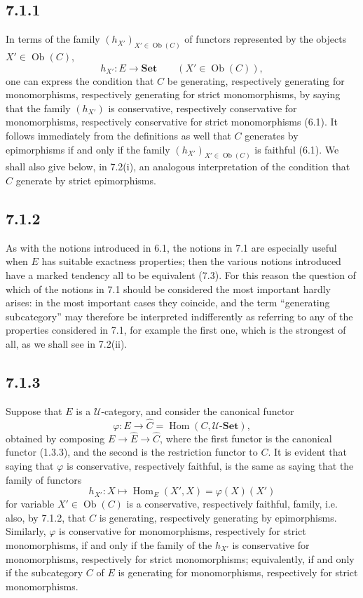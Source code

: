 \documentclass[11pt]{article}
\newcommand{\U}{\mathcal{U}}
\newcommand{\Set}{\mathbf{Set}}
\newcommand{\Ob}{\operatorname{Ob}}
\newcommand{\Hom}{\operatorname{Hom}}
\newcommand{\Hhom}{\operatorname{Hom}}
\begin{document}
\subsection*{7.1.1}
In terms of the family $(h_{X'})_{X'\in\Ob(C)}$ of functors represented by the objects $X'\in\Ob(C)$,
\[
h_{X'}:E\longrightarrow \Set\qquad (X'\in\Ob(C)),
\]
one can express the condition that $C$ be generating, respectively generating for monomorphisms, respectively generating for strict monomorphisms, by saying that the family $(h_{X'})$ is conservative, respectively conservative for monomorphisms, respectively conservative for strict monomorphisms (6.1). It follows immediately from the definitions as well that $C$ generates by epimorphisms if and only if the family $(h_{X'})_{X'\in\Ob(C)}$ is faithful (6.1). We shall also give below, in 7.2(i), an analogous interpretation of the condition that $C$ generate by strict epimorphisms.

\subsection*{7.1.2}
As with the notions introduced in 6.1, the notions in 7.1 are especially useful when $E$ has suitable exactness properties; then the various notions introduced have a marked tendency all to be equivalent (7.3). For this reason the question of which of the notions in 7.1 should be considered the most important hardly arises: in the most important cases they coincide, and the term ``generating subcategory'' may therefore be interpreted indifferently as referring to any of the properties considered in 7.1, for example the first one, which is the strongest of all, as we shall see in 7.2(ii).

\subsection*{7.1.3}
Suppose that $E$ is a $\U$-category, and consider the canonical functor
\begin{equation*}
\varphi:E\longrightarrow \widehat C=\Hhom(C,\U\text{-}\Set),\tag{7.1.3.1}
\end{equation*}
obtained by composing $E\to\widehat E\to\widehat C$, where the first functor is the canonical functor (1.3.3), and the second is the restriction functor to $C$. It is evident that saying that $\varphi$ is conservative, respectively faithful, is the same as saying that the family of functors
\[
h_{X'}:X\longmapsto \Hom_E(X',X)=\varphi(X)(X')
\]
for variable $X'\in\Ob(C)$ is a conservative, respectively faithful, family, i.e. also, by 7.1.2, that $C$ is generating, respectively generating by epimorphisms. Similarly, $\varphi$ is conservative for monomorphisms, respectively for strict monomorphisms, if and only if the family of the $h_{X'}$ is conservative for monomorphisms, respectively for strict monomorphisms; equivalently, if and only if the subcategory $C$ of $E$ is generating for monomorphisms, respectively for strict monomorphisms.
\end{document}
